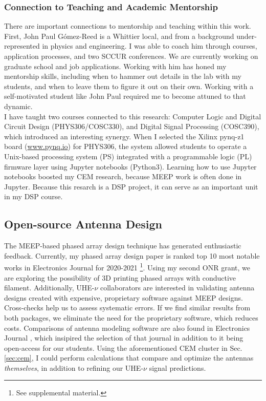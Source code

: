 \documentclass[../../../main.tex]{subfiles}
\begin{document}
\subsubsection{Connection to Teaching and Academic Mentorship}

There are important connections to mentorship and teaching within this work.  First, John Paul G\'{o}mez-Reed is a Whittier local, and from a background under-represented in physics and engineering.  I was able to coach him through courses, application processes, and two SCCUR conferences.  We are currently working on graduate school and job applications.  Working with him has honed my mentorship skills, including when to hammer out details in the lab with my students, and when to leave them to figure it out on their own.  Working with a self-motivated student like John Paul required me to become attuned to that dynamic.
\\
\vspace{0.25cm}
I have taught two courses connected to this research: Computer Logic and Digital Circuit Design (PHYS306/COSC330), and Digital Signal Processing (COSC390), which introduced an interesting synergy.  When I selected the Xilinx pynq-z1 board (\url{www.pynq.io}) for PHYS306, the system allowed students to operate a Unix-based processing system (PS) integrated with a programmable logic (PL) firmware layer using Jupyter notebooks (Python3).  Learning how to use Jupyter notebooks boosted my CEM research, because MEEP work is often done in Jupyter.  Because this resarch is a DSP project, it can serve as an important unit in my DSP course.

\subsection{Open-source Antenna Design}

The MEEP-based phased array design technique has generated enthusiastic feedback.  Currently, my phased array design paper is ranked top 10 most notable works in Electronics Journal for 2020-2021 \cite{electronics10040415}\footnote{See supplemental material.}.  Using my second ONR grant, we are exploring the possibility of 3D printing phased arrays with conductive filament.  Additionally, UHE-$\nu$ collaborators are interested in validating antenna designs created with expensive, proprietary software against MEEP designs.  Cross-checks help us to assess systematic errors.  If we find similar results from both packages, we eliminate the need for the proprietary software, which reduces costs.  Comparisons of antenna modeling software are also found in Electronics Journal \cite{10.3390/electronics8121506}, which insipired the selection of that journal in addition to it being open-access for our students.  Using the aforementioned CEM cluster in Sec. \ref{sec:cem}, I could perform calculations that compare and optimize the antennas \textit{themselves}, in addition to refining our UHE-$\nu$ signal predictions.
\end{document}

